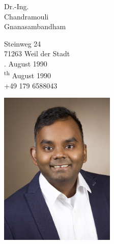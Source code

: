 \documentclass{classic}
\begin{document}
\sloppy %
\color{templateColor1}

\normalfont
\begin{minipage}[]{0.68\textwidth}
    \vspace{10mm}

    {\huge Dr.-Ing. }\\

    {\Huge Chandramouli}\\

    {\Huge Gnanasambandham}
    \vspace{2mm}

    \vspace{2mm}

    {\large
        Steinweg 24\\
        71263 Weil der Stadt\\

        {
            . August 1990\\
        }
        {
            \textsuperscript{th} August 1990\\
        }
        \telephoneIcon +49 179 6588043\\
        \mailIcon \href{mailto:chandramouli681990@gmail.com}{}
    }
  
    \vspace{13mm}
\end{minipage}
\begin{minipage}[c]{0.32\textwidth}
  \includegraphics[width=5.5cm]{../../img/ChandramouliNew1.jpg}
\end{minipage}
\end{document}
